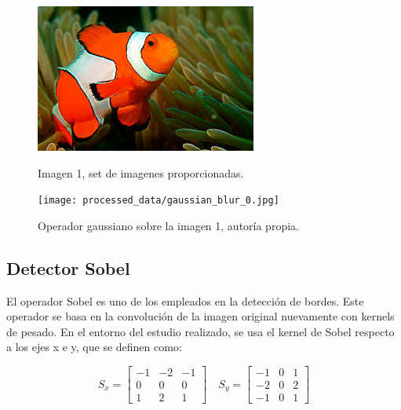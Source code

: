 \documentclass[a4paper,12pt]{article}
\begin{document}
{\begin{figure}[H]
\begin{minipage}[t]{0.4\textwidth}
    \centering
    \includegraphics[width=\textwidth]{data/000.jpg} 
    \caption{Imagen 1, set de imagenes proporcionadas.}
    \label{fig:original-image}
\end{minipage}
\hfill
\hspace{1.5cm}
\begin{minipage}[t]{0.4\textwidth}
    \centering
    \texttt{[image: processed\_data/gaussian\_blur\_0.jpg]} 
    \caption{Operador gaussiano sobre la imagen 1, autoría propia.}
    \label{fig:gaussian_filter}
\end{minipage}

\end{figure}

\subsection{Detector Sobel}

\vspace{0.5cm}

El operador Sobel es uno de los empleados en la detección de bordes. Este operador se basa en la convolución de la imagen original nuevamente con kernels de pesado.
En el entorno del estudio realizado, se usa el kernel de Sobel respecto a los ejes x e y, que se definen como:

\vspace{0.5cm}

\[
  S_x = \begin{bmatrix} -1 & -2 & -1 \\ 0 & 0 & 0 \\ 1 & 2 & 1 \end{bmatrix} \quad S_y =  \begin{bmatrix} -1 & 0 & 1 \\ -2 & 0 & 2 \\ -1 & 0 & 1 \end{bmatrix}
\]

}
\end{document}

